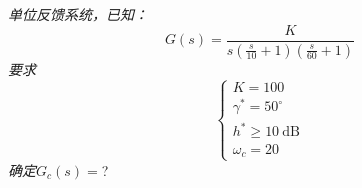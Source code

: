 \documentclass[handout,cjkutf8,table,aspectratio=1610]{beamer} %
\begin{document}
%			
%			

\begin{frame}{}
	\emph{单位反馈系统，已知：
	$$G(s) = \frac{K}{s(\frac{s}{10}+1)(\frac{s}{60}+1)}$$
	要求
	$$\begin{cases}
		K = 100\\
		\gamma^* = 50^\circ\\
		h^* \ge 10~\textrm{dB}\\
		\omega_c = 20
	\end{cases}$$
	确定$G_c(s)=$}?
\end{frame}
\end{document}
